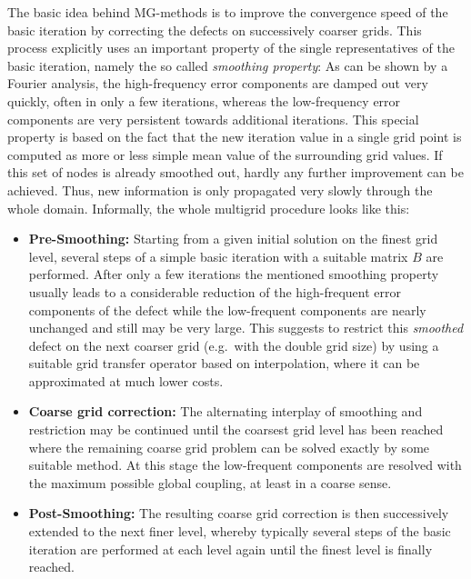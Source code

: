 The basic idea behind MG-methods is to improve the convergence speed of the basic iteration by correcting the defects on successively coarser grids.
This process explicitly uses an important property of the single representatives of the basic iteration, namely the so called {\it smoothing property}: As can be shown by a Fourier analysis, the high-frequency error components are damped out very quickly, often in only a few iterations, whereas the low-frequency error components are very persistent towards additional iterations.
This special property is based on the fact that the new iteration value in a single grid point is computed as more or less simple mean value of the surrounding grid values. If this set of nodes is already smoothed out, hardly any further improvement can be achieved. Thus, new information is only propagated very slowly through the whole domain. Informally, the whole multigrid procedure looks like this:

\begin{itemize}
\item {\bf Pre-Smoothing:}
Starting from a given initial solution on the finest grid level, several steps of a simple basic iteration with a suitable matrix $B$ are performed. After only a few iterations 
the mentioned smoothing property usually leads to a considerable reduction of the high-frequent error components of the defect while the low-frequent components are nearly unchanged and still may be very large. 
This suggests to restrict this  {\it smoothed}  defect  on the next coarser grid (e.g.\ with the double grid size) by using a suitable grid transfer operator based on interpolation, where it can be approximated at much lower costs. 
\item {\bf Coarse grid correction:} The alternating interplay of smoothing and restriction
may be continued until the coarsest grid level has been reached where the remaining coarse grid problem can be solved exactly by some suitable method. At this stage the low-frequent components are resolved with the maximum possible global coupling, at least in a coarse sense. 
\item {\bf Post-Smoothing:} The resulting coarse grid correction is then successively extended to the next finer level, whereby typically several steps of the basic iteration are performed at each level again until the finest level is finally reached.
\end{itemize}

